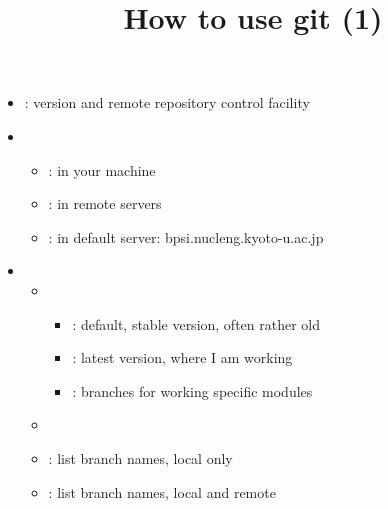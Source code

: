 \documentclass[12pt]{article}
\begin{document}
\title{How to use git (1)}
\begin{itemize}
\item
  : version and remote repository control facility
\item
{}
\begin{itemize}
\item
{}: in your machine
\item
{}: in remote servers
\item
{}: in default server: bpsi.nucleng.kyoto-u.ac.jp
\end{itemize}
\item
{}
\begin{itemize}
\item
{}
\begin{itemize}
\item
{}: default, stable version, often rather old
\item
{}: latest version, where I am working
\item
{}: branches for working specific modules
\end{itemize}
\item
{}
\item
{}\qquad : list branch names, local only
\item
{}\qquad : list branch names, local and remote
\end{itemize}
\end{itemize}
\end{document}
